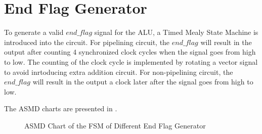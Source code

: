 \section{End Flag Generator}

To generate a valid \(end\_flag\) signal for the ALU, a Timed Mealy State Machine is introduced into the circuit.
For pipelining circuit, the \(end\_flag\) will result in the output after counting 4 synchronized clock cycles
when the  signal goes from high to low. The counting of the clock cycle is implemented by rotating a
vector signal to avoid inrtoducing extra addition circuit.
For non-pipelining circuit, the \(end\_flag\) will result in the output a clock later after the  signal goes from high to low.

The ASMD charts are presented in .

\begin{figure}[!ht]
	\centering
	\caption{ASMD Chart of the FSM of Different End Flag Generator}
	\label{fig:asmd}

	\hspace{1cm}

\end{figure}

